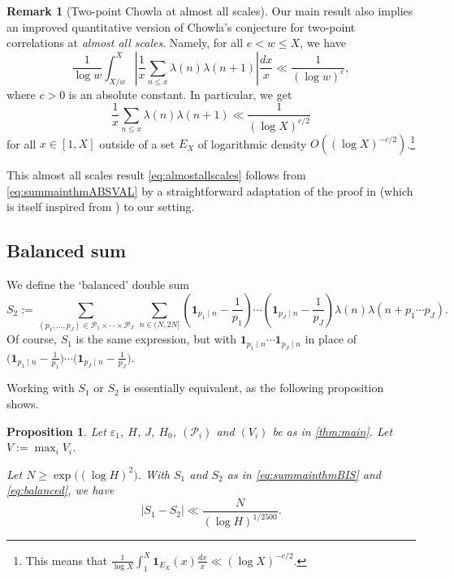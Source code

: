\documentclass[11pt]{amsart}
\newtheorem{proposition}[theorem]{Proposition}
\theoremstyle{definition}
\newtheorem{remark}[theorem]{Remark}
\renewcommand{\leq}{\leqslant}
\renewcommand{\geq}{\geqslant}
\newcommand{\abs}[1]{\left|#1\right|}
\newcommand{\ind}[1]{\mathbf{1}_{#1}}
\newcommand{\eps}{\varepsilon}
\newcommand{\primes}{\mathcal{P}}
\newcommand{\cstH}{\eps_1}
\newcommand{\curlyL}{V}
\newcommand{\repR}{J}
\begin{document}
\begin{remark}[Two-point Chowla at almost all scales]
\label{rem:almostallscales}
Our main result also implies an improved quantitative version of Chowla's conjecture for two-point correlations at \emph{almost all scales}. Namely, for all $e<w\leq X$, we have
\begin{equation}
\label{eq:almostallscales}
	\frac{1}{\log w} \int_{X/w}^X \abs{\frac{1}{x} \sum_{n\leq x} \lambda(n) \lambda(n+1)} \frac{dx}{x} \ll \frac{1}{(\log w)^c},
\end{equation}
where $c>0$ is an absolute constant. In particular, we get
\begin{equation*}
	\frac{1}{x} \sum_{n\leq x} \lambda(n) \lambda(n+1) \ll \frac{1}{(\log X)^{c/2}}%
\end{equation*} 
for all $x\in [1, X]$ outside of a set $E_X$ of logarithmic density $O((\log X)^{-c/2})$.\footnote{This means that $\displaystyle{\frac{1}{\log X}\int_1^X \ind{E_X}(x) \frac{dx}{x} \ll (\log X)^{-c/2}}$.}

This almost all scales result \cref{eq:almostallscales} follows from \cref{eq:summainthmABSVAL} by a straightforward adaptation of the proof in \cite[Section~8]{HR} (which is itself inspired from \cite{TT}) to our setting. 
\end{remark}



\subsection{Balanced sum}

We define the `balanced' double sum
\begin{equation}
\label{eq:balanced}
S_2 :=\! \sum_{(p_1,\ldots, p_{\repR})\in \primes_1\times\cdots\times \primes_{\repR}}\, \sum_{n\in (N, 2N]} \left(\ind{p_1\mid n} - \frac{1}{p_1}\right)\cdots \left(\ind{p_{\repR}\mid n} - \frac{1}{p_{\repR}}\right) \lambda(n) \lambda(n+p_1\cdots p_{\repR}).
\end{equation}
Of course, $S_1$ is the same expression, but with $\ind{p_1\mid n}\cdots \ind{p_{\repR}\mid n}$ in place of $\big(\ind{p_1\mid n} - \frac{1}{p_1}\big)\cdots \big(\ind{p_{\repR}\mid n} - \frac{1}{p_{\repR}}\big)$. 

Working with $S_1$ or $S_2$ is essentially equivalent, as the following proposition shows. 

\begin{proposition}
\label{prop:differencesum}
Let $\cstH$, $H$, $\repR$, $H_0$, $(\primes_i)$ and $(\curlyL_i)$ be as in \cref{thm:main}. Let $\curlyL := \max_i \curlyL_i$. 

Let $N \geq \exp\big((\log H)^{2}\big)$. With $S_1$ and $S_2$ as in \cref{eq:summainthmBIS} and \cref{eq:balanced}, we have
\begin{equation*}
\left| S_1 - S_2 \right| \ll \frac{N}{(\log H)^{1/2500}}.
\end{equation*}
\end{proposition}
\end{document}
